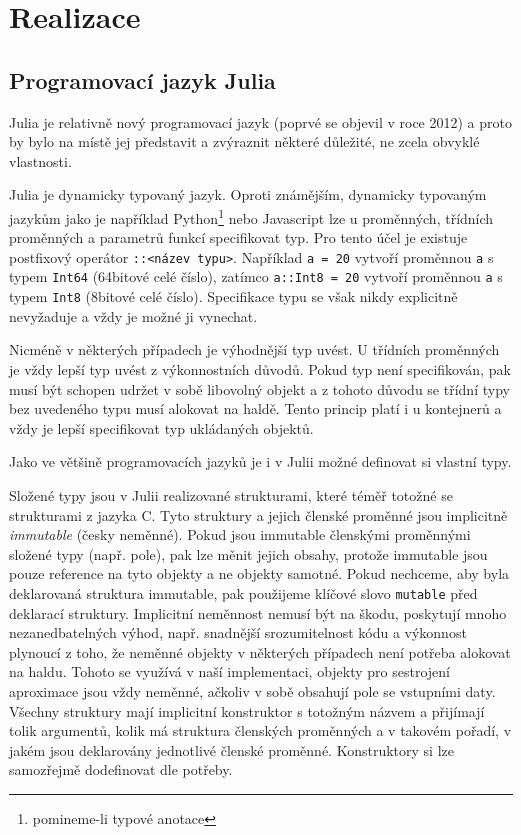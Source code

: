 \chapter{Realizace}

\section{Programovací jazyk Julia}

Julia je relativně nový programovací jazyk (poprvé se objevil v roce 2012\cite{julia-first}) a proto by bylo na místě jej představit a zvýraznit některé důležité, ne zcela obvyklé vlastnosti.

Julia je dynamicky typovaný jazyk. Oproti známějším, dynamicky typovaným jazykům jako je například Python\footnote{pomineme-li typové anotace} nebo Javascript lze u proměnných, třídních proměnných a parametrů funkcí specifikovat typ. Pro tento účel je existuje postfixový operátor \texttt{::<název typu>}. Například \texttt{a = 20} vytvoří proměnnou \texttt{a} s typem \texttt{Int64} (64bitové celé číslo), zatímco \texttt{a::Int8 = 20} vytvoří proměnnou \texttt{a} s typem \texttt{Int8} (8bitové celé číslo). Specifikace typu se však nikdy explicitně nevyžaduje a vždy je možné ji vynechat.

Nicméně v některých případech je výhodnější typ uvést. U třídních proměnných je vždy lepší typ uvést z výkonnostních důvodů. Pokud typ není specifikován, pak musí být schopen udržet v sobě libovolný objekt a z tohoto důvodu se třídní typy bez uvedeného typu musí alokovat na haldě. Tento princip platí i u kontejnerů a vždy je lepší specifikovat typ ukládaných objektů.\cite{julia-performance}

Jako ve většině programovacích jazyků je i v Julii možné definovat si vlastní typy.

Složené typy jsou v Julii realizované strukturami, které téměř totožné se strukturami z jazyka C. Tyto struktury a jejich členské proměnné jsou implicitně \textit{immutable} (česky neměnné). Pokud jsou immutable členskými proměnnými složené typy (např. pole), pak lze měnit jejich obsahy, protože immutable jsou pouze reference na tyto objekty a ne objekty samotné. Pokud nechceme, aby byla deklarovaná struktura immutable, pak použijeme klíčové slovo \texttt{mutable} před deklarací struktury. Implicitní neměnnost nemusí být na škodu, poskytují mnoho nezanedbatelných výhod, např. snadnější srozumitelnost kódu a výkonnost plynoucí z toho, že neměnné objekty v některých případech není potřeba alokovat na haldu. Tohoto se využívá v naší implementaci, objekty pro sestrojení aproximace jsou vždy neměnné, ačkoliv v sobě obsahují pole se vstupními daty. Všechny struktury mají implicitní konstruktor s totožným názvem a přijímají tolik argumentů, kolik má struktura členských proměnných a v takovém pořadí, v jakém jsou deklarovány jednotlivé členské proměnné. Konstruktory si lze samozřejmě dodefinovat dle potřeby.

